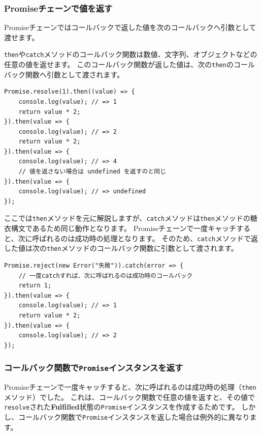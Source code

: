 \hypertarget{promise-chain-value}{%
\subsubsection{Promiseチェーンで値を返す}\label{promise-chain-value}}

Promiseチェーンではコールバックで返した値を次のコールバックへ引数として渡せます。

\texttt{then}や\texttt{catch}メソッドのコールバック関数は数値、文字列、オブジェクトなどの任意の値を返せます。
このコールバック関数が返した値は、次の\texttt{then}のコールバック関数へ引数として渡されます。

\begin{lstlisting}
Promise.resolve(1).then((value) => {
    console.log(value); // => 1
    return value * 2;
}).then(value => {
    console.log(value); // => 2
    return value * 2;
}).then(value => {
    console.log(value); // => 4
    // 値を返さない場合は undefined を返すのと同じ
}).then(value => {
    console.log(value); // => undefined
});
\end{lstlisting}

ここでは\texttt{then}メソッドを元に解説しますが、\texttt{catch}メソッドは\texttt{then}メソッドの糖衣構文であるため同じ動作となります。
Promiseチェーンで一度キャッチすると、次に呼ばれるのは成功時の処理となります。
そのため、\texttt{catch}メソッドで返した値は次の\texttt{then}メソッドのコールバック関数に引数として渡されます。

\begin{lstlisting}
Promise.reject(new Error("失敗")).catch(error => { 
    // 一度catchすれば、次に呼ばれるのは成功時のコールバック
    return 1;
}).then(value => {
    console.log(value); // => 1
    return value * 2;
}).then(value => {
    console.log(value); // => 2
});
\end{lstlisting}

\hypertarget{promise-then-return-promise}{%
\subsubsection{\texorpdfstring{コールバック関数で\texttt{Promise}インスタンスを返す}{コールバック関数でPromiseインスタンスを返す}}\label{promise-then-return-promise}}

Promiseチェーンで一度キャッチすると、次に呼ばれるのは成功時の処理（\texttt{then}メソッド）でした。
これは、コールバック関数で任意の値を返すと、その値で\texttt{resolve}された\textbf{Fulfilled}状態の\texttt{Promise}インスタンスを作成するためです。
しかし、コールバック関数で\texttt{Promise}インスタンスを返した場合は例外的に異なります。

